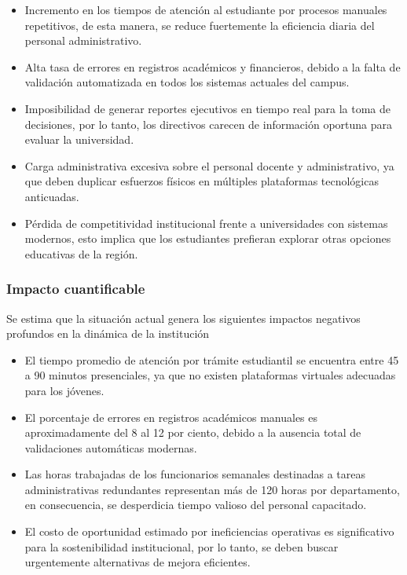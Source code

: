 \documentclass[11pt,spanish]{article}
\begin{document}
\begin{itemize}
    \item Incremento en los tiempos de atención al estudiante por procesos manuales repetitivos, de esta manera, se reduce fuertemente la eficiencia diaria del personal administrativo.
    \item Alta tasa de errores en registros académicos y financieros, debido a la falta de validación automatizada en todos los sistemas actuales del campus.
    \item Imposibilidad de generar reportes ejecutivos en tiempo real para la toma de decisiones, por lo tanto, los directivos carecen de información oportuna para evaluar la universidad.
    \item Carga administrativa excesiva sobre el personal docente y administrativo, ya que deben duplicar esfuerzos físicos en múltiples plataformas tecnológicas anticuadas.
    \item Pérdida de competitividad institucional frente a universidades con sistemas modernos, esto implica que los estudiantes prefieran explorar otras opciones educativas de la región.
\end{itemize}

\subsubsection{Impacto cuantificable}

Se estima que la situación actual genera los siguientes impactos negativos profundos en la dinámica de la institución

\begin{itemize}
    \item El tiempo promedio de atención por trámite estudiantil se encuentra entre 45 a 90 minutos presenciales, ya que no existen plataformas virtuales adecuadas para los jóvenes.
    \item El porcentaje de errores en registros académicos manuales es aproximadamente del 8 al 12 por ciento, debido a la ausencia total de validaciones automáticas modernas.
    \item Las horas trabajadas de los funcionarios semanales destinadas a tareas administrativas redundantes representan más de 120 horas por departamento, en consecuencia, se desperdicia tiempo valioso del personal capacitado.
    \item El costo de oportunidad estimado por ineficiencias operativas es significativo para la sostenibilidad institucional, por lo tanto, se deben buscar urgentemente alternativas de mejora eficientes.
\end{itemize}
\end{document}
